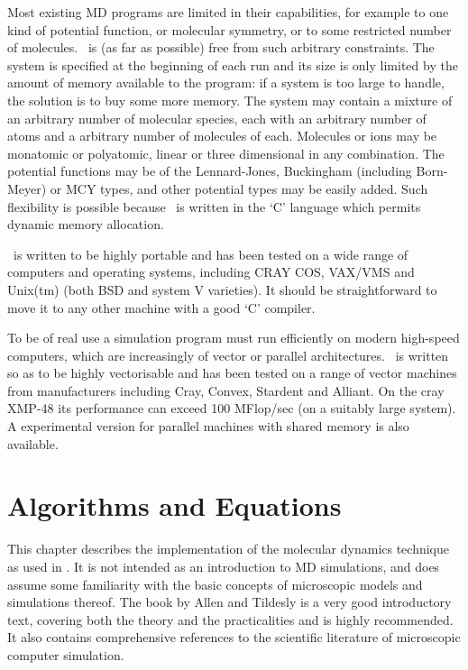 Most existing MD programs are limited in their capabilities, for
example to one kind of potential function, or molecular symmetry, or
to some restricted number of molecules.  \moldy\  is (as far as
possible) free from such arbitrary constraints.  The system is
specified at the beginning of each run and its size is only limited by
the amount of memory available to the program: if a system is too
large to handle, the solution is to buy some more memory.  The system
may contain a mixture of an arbitrary number of molecular species,
each with an arbitrary number of atoms and a arbitrary number of
molecules of each. Molecules or ions may be monatomic or polyatomic,
linear or three dimensional in any combination.  The potential
functions may be of the Lennard-Jones, Buckingham (including
Born-Meyer) or MCY types, and other potential types may be easily
added.  Such flexibility is possible because \moldy\  is written in the
`C' language which permits dynamic memory allocation.

\moldy\  is written to be highly portable and has been tested on a wide
range of computers and operating  systems, including CRAY COS, VAX/VMS
and  Unix(tm) (both   BSD  and  system  V  varieties).   It should  be
straightforward to  move  it to  any  other machine  with a   good `C'
compiler.

To be of real use a simulation  program must run efficiently on modern
high-speed computers, which  are  increasingly of vector   or parallel
architectures.  \moldy\  is written so  as to be highly vectorisable and
has been  tested on a   range of  vector machines  from  manufacturers
including Cray, Convex, Stardent and  Alliant.  On the cray XMP-48 its
performance can exceed 100 MFlop/sec (on a suitably large  system).  A
experimental version for parallel  machines with shared memory is also
available.

\chapter{Algorithms and Equations}

This chapter  describes the implementation  of the  molecular dynamics
technique as used in \moldy.  It is not intended as an introduction to
MD  simulations, and  does assume some    familiarity  with the  basic
concepts of microscopic models  and simulations thereof.  The book  by
Allen and Tildesly  \cite{allen:87}  is a  very good    introductory text,
covering   both the  theory  and  the  practicalities and  is   highly
recommended.  It   also  contains   comprehensive  references  to  the
scientific literature of microscopic computer simulation.

